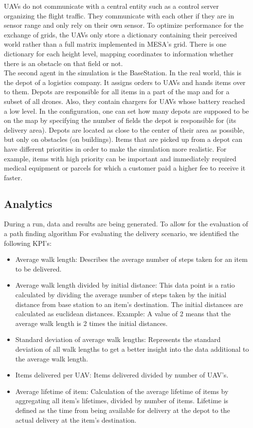 UAVs do not communicate with a central entity such as a control server organizing the flight traffic. They communicate with each other if they are in sensor range and only rely on their own sensor.
To optimize performance for the exchange of grids, the UAVs only store a dictionary containing their perceived world rather than a full matrix implemented in MESA's grid.
There is one dictionary for each height level, mapping coordinates to information whether there is an obstacle on that field or not.  
\\
The second agent in the simulation is the BaseStation. In the real world, this is the depot of a logistics company. It assigns orders to UAVs and hands items over to them. Depots are responsible for all items in a part of the map and for a subset of all drones. Also, they contain chargers for UAVs whose battery reached a low level. In the configuration, one can set how many depots are supposed to be on the map by specifying the number of fields the depot is responsible for (its delivery area). Depots are located as close to the center of their area as possible, but only on obstacles (on buildings). Items that are picked up from a depot can have different priorities in order to make the simulation more realistic. For example, items with high priority can be important and immediately required medical equipment or parcels for which a customer paid a higher fee to receive it faster.



\subsection{Analytics}\label{sec:KPI}
During a run, data and results are being generated. To allow for the evaluation of a path finding algorithm
For evaluating the delivery scenario, we identified the following KPI's:
\begin{itemize}
	\item Average walk length: Describes the average number of steps taken for an item to be delivered. 
	\item Average walk length divided by initial distance: This data point is a ratio calculated by dividing the average number of steps taken by the initial distance from base station to an item's destination. The initial distances are calculated as euclidean distances. Example: A value of 2 means that the average walk length is 2 times the initial distances.
	\item Standard deviation of average walk lengths: Represents the standard deviation of all walk lengths to get a better insight into the data additional to the average walk length.
	\item Items delivered per UAV: Items delivered divided by number of UAV's.
	\item Average lifetime of item: Calculation of the average lifetime of items by aggregating all item's lifetimes, divided by number of items. Lifetime is defined as the time from being available for delivery at the depot to the actual delivery at the item's destination.
\end{itemize}

